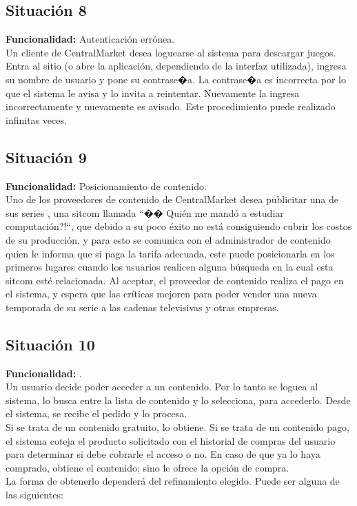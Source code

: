 \documentclass[11pt, a4paper, spanish]{article}
\begin{document}
\subsection{Situaci\'on 8}

	\textbf{Funcionalidad:} Autenticaci\'on err\'onea.\\

	Un cliente de CentralMarket desea loguearse al sistema para descargar juegos. Entra al sitio (o abre la aplicaci\'on, dependiendo de la interfaz 
   utilizada), ingresa su nombre de usuario y pone su contrase�a. La contrase�a es incorrecta por lo que el sistema le avisa y lo invita a reintentar. 
   Nuevamente la ingresa incorrectamente y nuevamente es avisado.
   Este procedimiento puede realizado infinitas veces.

\subsection{Situaci\'on 9}

	\textbf{Funcionalidad:} Posicionamiento de contenido.\\

	Uno de los proveedores de contenido de CentralMarket desea publicitar una de sus series , una sitcom llamada ``�� Qui\'en me mand\'o a estudiar    
   computaci\'on?!``, que debido a su poco \'exito no est\'a consiguiendo cubrir los costos de su producci\'on, y para esto se comunica con el administrador de 
   contenido quien le informa que si paga la tarifa adecuada, este puede posicionarla en los primeros lugares cuando los usuarios realicen alguna    
   b\'usqueda en la cual esta sitcom est\'e relacionada. Al aceptar, el proveedor de contenido realiza el pago en el sistema, y espera que las cr\'iticas    
   mejoren para poder vender una nueva temporada de su serie a las cadenas televisivas y otras empresas. 


\subsection{Situaci\'on 10}

	\textbf{Funcionalidad: } .\\

	Un usuario decide poder acceder a un contenido. Por lo tanto se loguea al sistema, lo busca entre la lista de contenido y lo selecciona, para 
   accederlo. Desde el sistema, se recibe el pedido y lo procesa.\\

       Si se trata de un contenido gratuito, lo obtiene. Si se trata de un contenido pago, el sistema coteja el producto solicitado con el historial de compras del usuario para determinar si debe cobrarle el acceso o no. En caso de que ya lo haya comprado, obtiene el contenido; sino le ofrece la opci\'on de compra.\\
       La forma de obtenerlo depender\'a del refinamiento elegido. Puede ser alguna de las siguientes:
\end{document}

